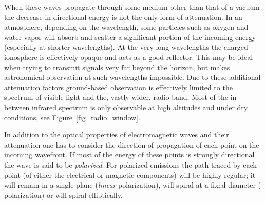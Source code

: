When these waves propagate through some medium other than that of a vacuum the decrease in directional energy is not the only form of attenuation. In an
atmosphere, depending on the wavelength, some particles such as oxygen and water vapor will absorb and scatter a significant portion of the incoming 
energy (especially at shorter wavelengths). At the very long wavelengths the charged ionosphere is effectively opaque and acts as a good reflector. This may 
be ideal when trying to transmit signals very far beyond the horizon, but makes astronomical observation at such wavelengths impossible.  Due to these additional attenuation 
factors ground-based observation is effectively limited to the spectrum of visible light and the, vastly wider, radio band. Most of the in-between 
infrared spectrum is only observable at high altitudes and under dry conditions, see Figure~\ref{fig_radio_window}. 

In addition to the optical properties of electromagnetic waves and their attenuation one has to consider the direction of propagation of each point on the incoming wavefront. If most of the energy of these points is strongly 
directional the wave is said to be \textit{polarized}. For polarized emissions the path traced by each point (of either the electrical or magnetic components) will be highly regular; it will 
remain in a single plane (\textit{linear} polarization), will spiral at a fixed diameter ( polarization) or will spiral elliptically. 

